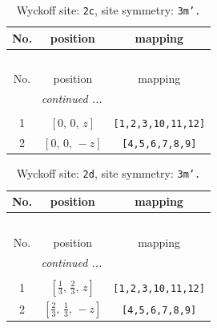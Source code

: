 \documentclass[fleqn,8pt]{jsarticle}
\begin{document}
\begin{longtable}{ccc}
\caption{Wyckoff site: {\tt 2c}, site symmetry: {\tt 3m'.}}
 \\
 \hline \hline
No. & position & mapping \\ \hline \endfirsthead

\multicolumn{2}{l}{\tablename\ \thetable{}} \\
 \hline \hline
No. & position & mapping \\ \hline \endhead

 \hline \hline
\multicolumn{2}{r}{\footnotesize\it continued ...} \\ \endfoot

 \hline \hline
\multicolumn{2}{r}{} \\ \endlastfoot

1 & $\left[ 0,\, 0,\, z \right]$ & {\tt [1,2,3,10,11,12]} \\ \hline
2 & $\left[ 0,\, 0,\, - z \right]$ & {\tt [4,5,6,7,8,9]} \\
\end{longtable}
\renewcommand{\arraystretch}{1.2}
\begin{longtable}{ccc}
\caption{Wyckoff site: {\tt 2d}, site symmetry: {\tt 3m'.}}
 \\
 \hline \hline
No. & position & mapping \\ \hline \endfirsthead

\multicolumn{2}{l}{\tablename\ \thetable{}} \\
 \hline \hline
No. & position & mapping \\ \hline \endhead

 \hline \hline
\multicolumn{2}{r}{\footnotesize\it continued ...} \\ \endfoot

 \hline \hline
\multicolumn{2}{r}{} \\ \endlastfoot

1 & $\left[ \frac{1}{3},\, \frac{2}{3},\, z \right]$ & {\tt [1,2,3,10,11,12]} \\ \hline
2 & $\left[ \frac{2}{3},\, \frac{1}{3},\, - z \right]$ & {\tt [4,5,6,7,8,9]} \\
\end{longtable}
\renewcommand{\arraystretch}{1.2}
\end{document}
